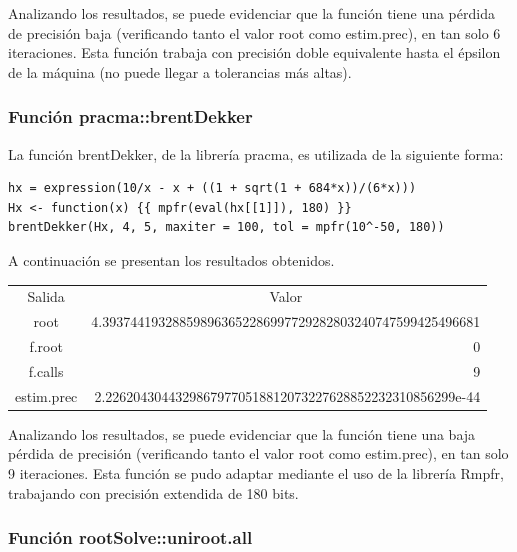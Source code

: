 \documentclass[a4paper,12pt]{article}
\begin{document}
Analizando los resultados, se puede evidenciar que la función tiene una pérdida de precisión baja (verificando tanto el valor root como estim.prec), en tan solo 6 iteraciones. Esta función trabaja con precisión doble equivalente hasta el épsilon de la máquina (no puede llegar a tolerancias más altas). \par

\subsubsection{Función pracma::brentDekker}

La función brentDekker, de la librería pracma, es utilizada de la siguiente forma: \par

\begin{verbatim}
hx = expression(10/x - x + ((1 + sqrt(1 + 684*x))/(6*x)))
Hx <- function(x) {{ mpfr(eval(hx[[1]]), 180) }}
brentDekker(Hx, 4, 5, maxiter = 100, tol = mpfr(10^-50, 180))
\end{verbatim}

A continuación se presentan los resultados obtenidos. \par

\newpage

\begin{table}[ht!]
\begin{tabular}{cr}
Salida     & \multicolumn{1}{c}{Valor}                                \\
root       & 4.393744193288598963652286997729282803240747599425496681 \\
f.root     & 0 \\
f.calls    & 9                                                     \\
estim.prec & 2.22620430443298679770518812073227628852232310856299e-44 
\end{tabular}
\end{table}

Analizando los resultados, se puede evidenciar que la función tiene una baja pérdida de precisión (verificando tanto el valor root como estim.prec), en tan solo 9 iteraciones. Esta función se pudo adaptar mediante el uso de la librería Rmpfr, trabajando con precisión extendida de 180 bits. \par

\subsubsection{Función rootSolve::uniroot.all}
\end{document}
